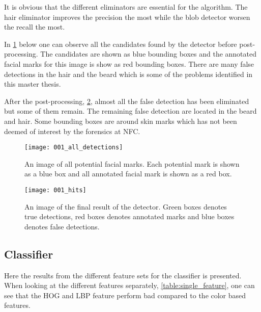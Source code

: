 It is obvious that the different eliminators are essential for the algorithm. The hair eliminator improves the precision the most while the blob detector worsen the recall the most.     


In \cref{fig:all_detections} below one can observe all the candidates found by the detector before post-processing. The candidates are shown as blue bounding boxes and the annotated facial marks for this image is show as red bounding boxes. There are many false detections in the hair and the beard which is some of the problems identified in this master thesis. 

After the post-processing, \cref{fig:all_hits}, almost all the false detection has been eliminated but some of them remain. The remaining false detection are located in the beard and hair. Some bounding boxes are around skin marks which has not been deemed of interest by the forensics at NFC. 

\FloatBarrier
\begin{figure}[h]
	\centering
	\texttt{[image: 001\_all\_detections]}
	\caption{An image of all potential facial marks. Each potential mark is shown as a blue box and all annotated facial mark is shown as a red box. \label{fig:all_detections}}
\end{figure}
\FloatBarrier

\FloatBarrier
\begin{figure}[h]
	\centering
	\texttt{[image: 001\_hits]}
	\caption{An image of the final result of the detector. Green boxes denotes true detections, red boxes denotes annotated marks and blue boxes denotes false detections. \label{fig:all_hits}}
\end{figure}
\FloatBarrier

\subsection{Classifier}

Here the results from the different feature sets for the classifier is presented. When looking at the different features separately, \cref{table:single_feature}, one can see that the HOG and LBP feature perform bad compared to the color based features. 


